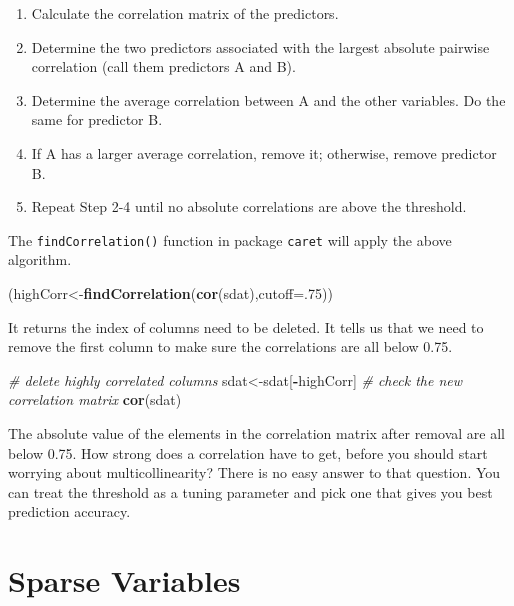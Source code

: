 \documentclass[12pt,]{krantz}
\makeatletter
\newenvironment{Shaded}{\begin{snugshade}}{\end{snugshade}}
\newcommand{\KeywordTok}[1]{\textcolor[rgb]{0.27,0.27,0.27}{\textbf{#1}}}
\newcommand{\DataTypeTok}[1]{\textcolor[rgb]{0.27,0.27,0.27}{#1}}
\newcommand{\DecValTok}[1]{\textcolor[rgb]{0.06,0.06,0.06}{#1}}
\newcommand{\CommentTok}[1]{\textcolor[rgb]{0.37,0.37,0.37}{\textit{#1}}}
\newcommand{\OperatorTok}[1]{\textcolor[rgb]{0.43,0.43,0.43}{\textbf{#1}}}
\newcommand{\NormalTok}[1]{#1}
\providecommand{\tightlist}{%
  \setlength{\itemsep}{0pt}\setlength{\parskip}{0pt}}
\renewenvironment{quote}{\begin{VF}}{\end{VF}}
\newenvironment{kframe}{%
\medskip{}
\setlength{\fboxsep}{.8em}
 \def\at@end@of@kframe{}%
 \ifinner\ifhmode%
  \def\at@end@of@kframe{\end{minipage}}%
  \begin{minipage}{\columnwidth}%
 \fi\fi%
 \def\FrameCommand##1{\hskip\@totalleftmargin \hskip-\fboxsep
 \colorbox{shadecolor}{##1}\hskip-\fboxsep
     \hskip-\linewidth \hskip-\@totalleftmargin \hskip\columnwidth}%
 \MakeFramed {\advance\hsize-\width
   \@totalleftmargin\z@ \linewidth\hsize
   \@setminipage}}%
 {\par\unskip\endMakeFramed%
 \at@end@of@kframe}
\renewenvironment{Shaded}{\begin{kframe}}{\end{kframe}}
\theoremstyle{definition}
\theoremstyle{definition}
\theoremstyle{definition}
\theoremstyle{remark}
\makeatother
\begin{document}
\begin{quote}
\begin{enumerate}
\def\labelenumi{(\arabic{enumi})}
\tightlist
\item
  Calculate the correlation matrix of the predictors.
\item
  Determine the two predictors associated with the largest absolute
  pairwise correlation (call them predictors A and B).
\item
  Determine the average correlation between A and the other variables.
  Do the same for predictor B.
\item
  If A has a larger average correlation, remove it; otherwise, remove
  predictor B.
\item
  Repeat Step 2-4 until no absolute correlations are above the
  threshold.
\end{enumerate}
\end{quote}

The \texttt{findCorrelation()} function in package \texttt{caret} will
apply the above algorithm.

\begin{Shaded}
\begin{Highlighting}[]
\NormalTok{(highCorr<-}\KeywordTok{findCorrelation}\NormalTok{(}\KeywordTok{cor}\NormalTok{(sdat),}\DataTypeTok{cutoff=}\NormalTok{.}\DecValTok{75}\NormalTok{))}
\end{Highlighting}
\end{Shaded}

It returns the index of columns need to be deleted. It tells us that we
need to remove the first column to make sure the correlations are all
below 0.75.

\begin{Shaded}
\begin{Highlighting}[]
\CommentTok{# delete highly correlated columns}
\NormalTok{sdat<-sdat[}\OperatorTok{-}\NormalTok{highCorr]}
\CommentTok{# check the new correlation matrix}
\KeywordTok{cor}\NormalTok{(sdat)}
\end{Highlighting}
\end{Shaded}

The absolute value of the elements in the correlation matrix after
removal are all below 0.75. How strong does a correlation have to get,
before you should start worrying about multicollinearity? There is no
easy answer to that question. You can treat the threshold as a tuning
parameter and pick one that gives you best prediction accuracy.

\section{Sparse Variables}\label{sparse-variables}
\end{document}
